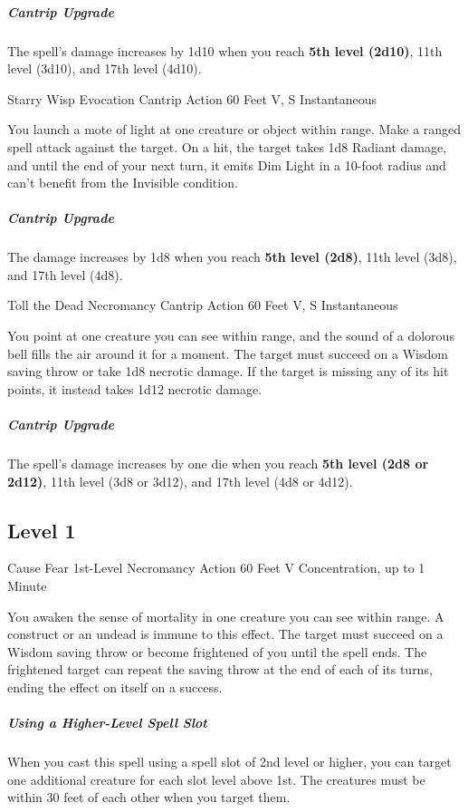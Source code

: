 \documentclass[letterpaper,openany,oneside,twocolumn]{book}
\begin{document}
\subparagraph*{Cantrip Upgrade} The spell's damage increases by 1d10 when you reach \textbf{5th level (2d10)}, 11th level (3d10), and 17th level (4d10).

\DndSpellHeader
  {Starry Wisp}
  {Evocation Cantrip}
  {Action}
  {60 Feet}
  {V, S}
  {Instantaneous}

You launch a mote of light at one creature or object within range. Make a ranged spell attack against the target. On a hit, the target takes 1d8 Radiant damage, and until the end of your next turn, it emits Dim Light in a 10-foot radius and can't benefit from the Invisible condition.

\subparagraph*{Cantrip Upgrade} The damage increases by 1d8 when you reach \textbf{5th level (2d8)}, 11th level (3d8), and 17th level (4d8).

\DndSpellHeader
  {Toll the Dead}
  {Necromancy Cantrip}
  {Action}
  {60 Feet}
  {V, S}
  {Instantaneous}

You point at one creature you can see within range, and the sound of a dolorous bell fills the air around it for a moment. The target must succeed on a Wisdom saving throw or take 1d8 necrotic damage. If the target is missing any of its hit points, it instead takes 1d12 necrotic damage.

\subparagraph*{Cantrip Upgrade} The spell's damage increases by one die when you reach \textbf{5th level (2d8 or 2d12)}, 11th level (3d8 or 3d12), and 17th level (4d8 or 4d12).

\subsection*{Level 1}

\DndSpellHeader
  {Cause Fear}
  {1st-Level Necromancy}
  {Action}
  {60 Feet}
  {V}
  {Concentration, up to 1 Minute}

You awaken the sense of mortality in one creature you can see within range. A construct or an undead is immune to this effect. The target must succeed on a Wisdom saving throw or become frightened of you until the spell ends. The frightened target can repeat the saving throw at the end of each of its turns, ending the effect on itself on a success.

\subparagraph*{Using a Higher-Level Spell Slot} When you cast this spell using a spell slot of 2nd level or higher, you can target one additional creature for each slot level above 1st. The creatures must be within 30 feet of each other when you target them.
\end{document}
